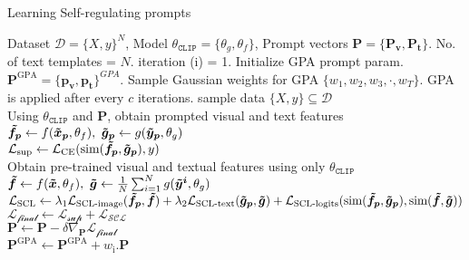 \documentclass[10pt,twocolumn,letterpaper]{article}
\begin{document}
\begin{algorithm}[!t]\small
   \caption{Learning Self-regulating prompts}
   \label{alg:example}
\begin{algorithmic}
    Dataset $\mathcal{D}=\{X, y\}^{N}$, Model ${\theta}_{\mathtt{CLIP}} = \{\theta_{g} , \theta_{f} \}$, Prompt vectors $ \bm{P} = \{ \bm{P_{v}}, \bm{P_{t}}\}$. No. of text templates = $N$. iteration (i) = 1.
    Initialize GPA prompt param. $ \bm{P}^{\text{GPA}} = \{ \bm{p_{v}}, \bm{p_{t}}\}^{GPA}$. Sample Gaussian weights for GPA $\{w_{1}, w_{2}, w_{3}, \cdot, w_{T} \}$. GPA is applied after every $c$ iterations.
   \STATE sample data $\{X, y\} \subseteq \mathcal{D}$ \\
   \STATE Using ${\theta}_{\mathtt{CLIP}}$ and $\bm{P}$, obtain prompted visual and text features $\bm{\Tilde{f_p}} \leftarrow  f(\bm{\Tilde{x}_p}, \theta_{{f}}),~ \bm{\Tilde{g}_p} \leftarrow  g(\bm{\Tilde{y}_p}, \theta_{g})$  \\
   \STATE $\mathcal{L_{\text{sup}}} \leftarrow \mathcal{L_{\text{CE}}}(\text{sim}(\bm{\Tilde{f}_p},\bm{\Tilde{g}_{p}}), y)$ \\
   \STATE Obtain pre-trained visual and textual features using only ${\theta}_{\mathtt{CLIP}}$  $\bm{\Tilde{f}} \leftarrow  f(\bm{\Tilde{x}}, \theta_{{f}}),~ \bm{\Tilde{g}} \leftarrow \frac{1}{N} \sum_{i=1}^{N} g(\bm{\Tilde{y}^{i}}, \theta_{g})$  \\ 
      \STATE $\mathcal{L_{\text{SCL}}} \leftarrow \lambda_{1}\mathcal{L_{\text{SCL-image}}}(\bm{\Tilde{f}_{p}},\bm{\Tilde{f}}) + \lambda_{2}\mathcal{L_{\text{SCL-text}}}(\bm{\Tilde{g}_{p}},\bm{\Tilde{g}}) + \mathcal{L_{\text{SCL-logits}}}(\text{sim}(\bm{\Tilde{f}_p},\bm{\Tilde{g}_{p}}), \text{sim}(\bm{\Tilde{f}},\bm{\Tilde{g}}))$ \\
    \STATE $\mathcal{L_{\text{final}}} \leftarrow  \mathcal{L_{\text{sup}}} +  \mathcal{L_{\text{SCL}}} $ \\
    $ \bm{P} \leftarrow \bm{P} -  \delta \nabla_{\bm{P}} \mathcal{L_{\text{final}}} $
   \quad \\
   \STATE $\bm{P}^{\text{GPA}} \leftarrow \bm{P}^{\text{GPA}} + w_{\text{i}} . \bm{P}$
   \ENDIF
   \ENDFOR
\end{algorithmic}
\end{algorithm}
\end{document}
